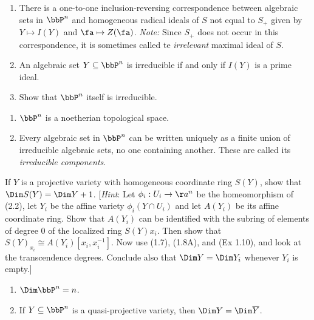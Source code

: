 \begin{exercise}[2.4]
    \begin{enumerate}
        \item There is a one-to-one inclusion-reversing correspondence between
        algebraic sets in $\bbP^n$ and homogeneous radical ideals of $S$ not equal
        to $S_+$ given by $Y \mapsto I(Y)$ and $\fa \mapsto
        Z(\fa)$. \emph{Note:} Since $S_{+}$ does not occur in this correspondence, 
        it is sometimes called te \emph{irrelevant} maximal ideal of $S$. 
        
        \item An algebraic set $Y \subseteq \bbP^n$ is irreducible if and only if $I(Y)$ is a prime ideal. 
        \item Show that $\bbP^n$ itself is irreducible. 
    \end{enumerate}
\end{exercise}

\begin{exercise}[2.5]
    \begin{enumerate}
        \item $\bbP^n$ is a noetherian topological space. 
        \item Every algebraic set in $\bbP^n$ can be written uniquely as a finite
          union of irreducible algebraic sets, no one containing another. These are
          called its \emph{irreducible components}. 
    \end{enumerate}
\end{exercise}

\begin{exercise}[2.6]
    If $Y$ is a projective variety with homogeneous coordinate ring $S(Y)$, show that $\Dim S(Y) = \Dim Y + 1$. 
    [\emph{Hint}: Let $\phi_i: U_i \to \aa^n$ be the homeomorphism of (2.2), 
    let $Y_i$ be the affine variety $\phi_i(Y \cap U_i)$ and let $A(Y_i)$ be its affine coordinate ring.
    Show that $A(Y_i)$ can be identified with the subring of elements of degree 0 of the 
    localized ring $S(Y)x_i$. Then show that $S(Y)_{x_i} \cong A(Y_i)[x_i, x_i^{-1}]$. 
    Now use (1.7), (1.8A), and (Ex 1.10), and look at the transcendence degrees. Conclude also that 
    $\Dim Y = \Dim Y_i$ whenever $Y_i$ is empty.]
\end{exercise}

\begin{exercise}[2.7]
    \begin{enumerate}
        \item $\Dim \bbP^n = n$.
        \item If $Y \subseteq \bbP^n$ is a quasi-projective variety, then $\Dim Y = \Dim \overline{Y}$.
    \end{enumerate}
\end{exercise}

